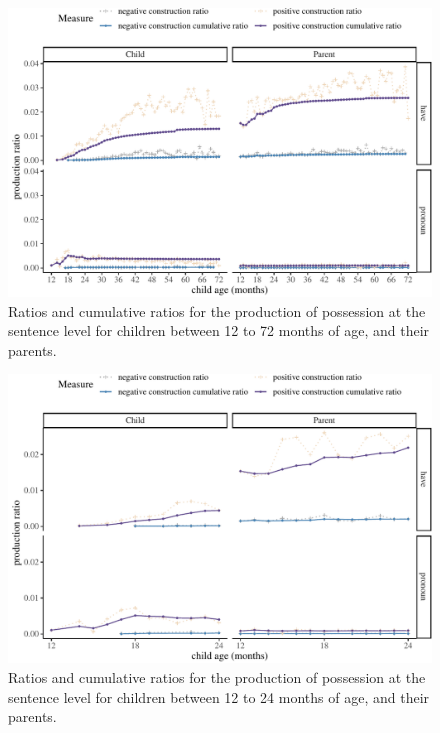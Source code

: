 \documentclass[
  english,
  man,floatsintext]{apa6}
\begin{document}
\begin{figure}[H]

{\centering \includegraphics{neg_construction_article_files/figure-latex/possession-1} 

}

\caption{Ratios and cumulative ratios for the production of possession at the sentence level for children between 12 to 72 months of age, and their parents.}\label{fig:possession}
\end{figure}

\begin{figure}[H]

{\centering \includegraphics{neg_construction_article_files/figure-latex/possessionbegin-1} 

}

\caption{Ratios and cumulative ratios for the production of possession at the sentence level for children between 12 to 24 months of age, and their parents.}\label{fig:possessionbegin}
\end{figure}
\end{document}
